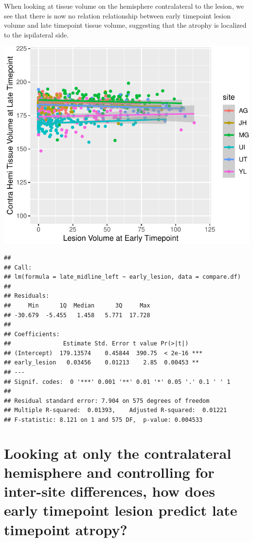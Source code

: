 \documentclass[
]{article}
\begin{document}
When looking at tissue volume on the hemisphere contralateral to the
lesion, we see that there is now no relation relationship between early
timepoint lesion volume and late timepoint tissue volume, suggesting
that the atrophy is localized to the ispilateral side.

\begin{center}\includegraphics{paper_files/figure-latex/plot_raw_contra-1} \end{center}

\begin{verbatim}
## 
## Call:
## lm(formula = late_midline_left ~ early_lesion, data = compare.df)
## 
## Residuals:
##     Min      1Q  Median      3Q     Max 
## -30.679  -5.455   1.458   5.771  17.728 
## 
## Coefficients:
##               Estimate Std. Error t value Pr(>|t|)    
## (Intercept)  179.13574    0.45844  390.75  < 2e-16 ***
## early_lesion   0.03456    0.01213    2.85  0.00453 ** 
## ---
## Signif. codes:  0 '***' 0.001 '**' 0.01 '*' 0.05 '.' 0.1 ' ' 1
## 
## Residual standard error: 7.904 on 575 degrees of freedom
## Multiple R-squared:  0.01393,    Adjusted R-squared:  0.01221 
## F-statistic: 8.121 on 1 and 575 DF,  p-value: 0.004533
\end{verbatim}

\hypertarget{looking-at-only-the-contralateral-hemisphere-and-controlling-for-inter-site-differences-how-does-early-timepoint-lesion-predict-late-timepoint-atropy}{%
\section{Looking at only the contralateral hemisphere and controlling
for inter-site differences, how does early timepoint lesion predict late
timepoint
atropy?}\label{looking-at-only-the-contralateral-hemisphere-and-controlling-for-inter-site-differences-how-does-early-timepoint-lesion-predict-late-timepoint-atropy}}
\end{document}
